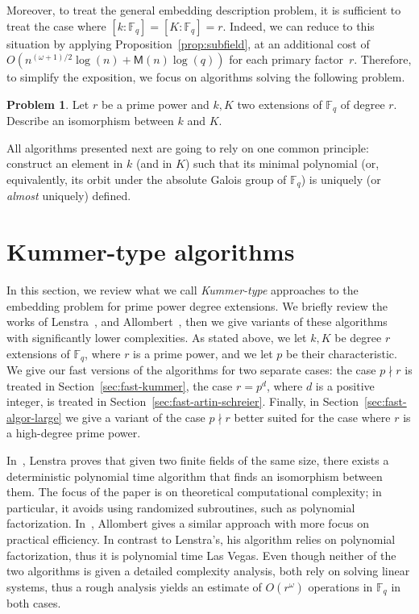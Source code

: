 \documentclass{mcom-l}
\theoremstyle{plain}
\theoremstyle{definition}
\newtheorem*{problem}{Problem}
\newcommand{\F}{\ensuremath{\mathbb{F}}}
\newcommand{\MM}{\ensuremath{\mathsf{M}}}
\newcounter{algorithm}
\begin{document}
Moreover, to treat the general embedding description problem,
it is sufficient to treat the case where $[k:\F_q]=[K:\F_q]=r$.
Indeed, we can reduce to this situation by applying
Proposition~\ref{prop:subfield}, at an additional cost of
$O(n^{(\omega+1)/2}\log(n) + \MM(n)\log(q))$ for each primary factor~$r$.
Therefore, to simplify the exposition, we focus on algorithms
solving the following problem.
\begin{problem}
\label{prob:embedding}
Let $r$ be a prime power and $k, K$ two extensions of $\F_q$
of degree $r$.
Describe an isomorphism between $k$ and $K$.
\end{problem}
All algorithms presented next are going to rely on one common
principle: construct an element in $k$ (and in $K$) such that its
minimal polynomial (or, equivalently, its orbit under the absolute
Galois group of $\F_q$) is uniquely (or \emph{almost} uniquely)
defined.

\section{Kummer-type algorithms}
\label{sec:kummer}

In this section, we review what we call \emph{Kummer-type} approaches to the embedding problem for prime power degree extensions. 
We briefly review the works of Lenstra~\cite{LenstraJr91},
and Allombert~\cite{Allombert02,Allombert02-rev}, then 
we give variants of these algorithms with significantly lower complexities.
As stated above, we let $k, K$ be degree $r$ extensions of $\F_q$,
where $r$ is a prime power,
and we let $p$ be their characteristic.
We give our fast versions of the algorithms for two separate cases: the case $p \nmid r$
is treated in Section~\ref{sec:fast-kummer}, the case $r = p^d$, where $d$ 
is a positive integer, is treated in Section~\ref{sec:fast-artin-schreier}.
Finally, in Section~\ref{sec:fast-algor-large} we give a variant of the case
$p \nmid r$ better suited for the case where $r$ is a high-degree prime power.

In~\cite{LenstraJr91}, Lenstra proves that 
given two finite fields of the same size, there exists a deterministic polynomial time algorithm 
that finds an isomorphism between them.
The focus of the paper is on theoretical computational complexity;
in particular, it avoids using randomized subroutines, such as polynomial
factorization. 
In~\cite{Allombert02,Allombert02-rev}, Allombert gives a similar approach with more focus on practical efficiency.
In contrast to Lenstra's, his algorithm relies on polynomial factorization, thus it is
polynomial time Las Vegas.
Even though neither of the two algorithms is given a detailed complexity analysis, both rely
on solving linear systems, thus a rough analysis yields an estimate of $O(r^{\omega})$ operations
in $\F_q$ in both cases.
\end{document}
